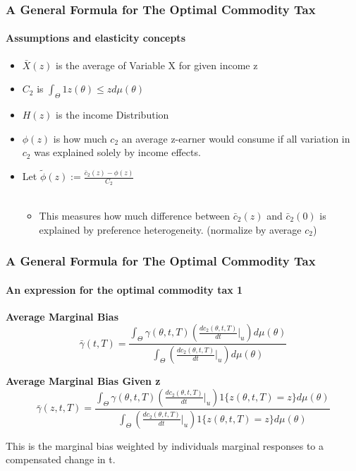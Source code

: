 \documentclass{beamer}
\begin{document}
\begin{frame}
\frametitle{A General Formula for The Optimal Commodity Tax}
\framesubtitle{Assumptions and elasticity concepts}


\begin{itemize}
	\item $\bar{X}(z)$ is the average of Variable X for given income z 
	\item $C_2$ is $\int_{\Theta}^{}1{z(\theta ) \leq z}d\mu(\theta)$
	\item 	$H(z)$ is the income Distribution 
	\item $\phi(z)$ is how much $c_2$ an average z-earner would consume if all variation in $c_2$ was explained solely by income effects. 
	\item Let $\tilde{\phi}(z) := \frac{\bar{c}_2(z) - \phi(z)}{C_2}$ \\~\\ 
	
	\begin{itemize}
		\item This measures how much difference between $\bar{c}_2(z)$ and $\bar{c}_2(0)$ is explained by preference heterogeneity. (normalize by average $c_2$)
	\end{itemize}
	
\end{itemize}

\end{frame}



\begin{frame}
\frametitle{A General Formula for The Optimal Commodity Tax}
\framesubtitle{An expression for the optimal commodity tax 1}

\textbf{Average Marginal Bias}
$$ \bar{\gamma}(t,T) = \frac{\int_{\Theta}\gamma(\theta,t,T) \left( \frac{dc_2(\theta,t,T)}{dt}  \biggr\rvert_{u} \right)d\mu(\theta)}{\int_{\Theta}\left( \frac{dc_2(\theta,t,T)}{dt}  \biggr\rvert_{u} \right)d\mu(\theta)}$$

\textbf{Average Marginal Bias Given z}
$$ \bar{\gamma}(z,t,T) = \frac{\int_{\Theta}\gamma(\theta,t,T) \left( \frac{dc_2(\theta,t,T)}{dt}  \biggr\rvert_{u} \right) 1 \{ z(\theta,t,T) = z \} d \mu(\theta)  }    {\int_{\Theta}\left( \frac{dc_2(\theta,t,T)}{dt}  \biggr\rvert_{u} \right) 1 \{ z(\theta,t,T) = z \} d\mu(\theta)}$$


This is the marginal bias weighted by individuals marginal responses to a compensated change in t.


\end{frame}
\end{document}

